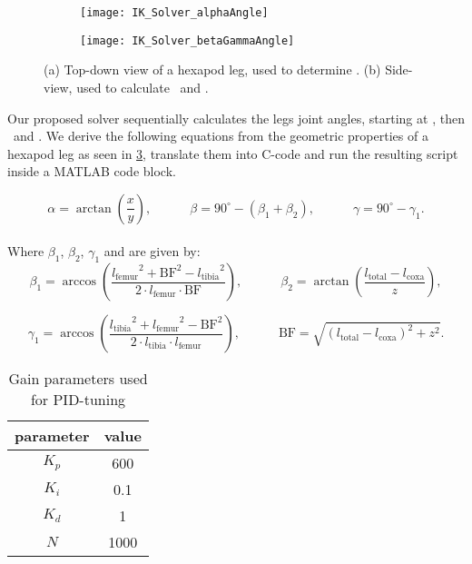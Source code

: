 \begin{figure}[!h]
	\begin{subfigure}{.5\textwidth} %
		\centering
		\texttt{[image: IK\_Solver\_alphaAngle]}  %
		\caption{}
		\label{figure: IK Solver Alpha Angle}
	\end{subfigure}
	\begin{subfigure}{.5\textwidth}
		\centering
		\texttt{[image: IK\_Solver\_betaGammaAngle]}  
		\caption{}
		\label{figure: IK Solver Beta/Gamma Angle}
	\end{subfigure}
	\caption[Angle derivation drawings]{(a) Top-down view of a hexapod leg, used to determine \textalpha. (b) Side-view, used to calculate \textbeta \ and \textgamma.}
	\label{figure: IK angle derivations}
\end{figure}

Our proposed solver sequentially calculates the legs joint angles, starting at \textalpha, then \textbeta \ and \textgamma.
We derive the following equations from the geometric properties of a hexapod leg as seen in \ref{figure: IK angle derivations}, translate them into C-code and run the resulting script inside a MATLAB code block.

\[
	\alpha = \arctan(\frac{x}{y}) ,\quad \quad \quad \beta = 90^{\circ} - (\beta_1 + \beta_2) ,\quad \quad \quad \gamma = 90^{\circ} - \gamma_1.
\]
\\
Where $\beta_1$, $\beta_2$, $\gamma_1$ and  are given by:
\[	
	\beta_1 = \arccos(\frac{{l_\text{femur}}^2 + \text{BF}^2 - {l_\text{tibia}}^2}  {2\cdot l_\text{femur} \cdot \text{BF}}) ,\quad \quad \quad \beta_2 = \arctan(\frac{ l_\text{total} - l_\text{coxa}} {z}),
\]

\[
	\gamma_1 = \arccos(\frac{{l_\text{tibia}}^2 + {l_\text{femur}}^2 - {\text{BF}}^2}  {2 \cdot {l_\text{tibia}} \cdot {l_\text{femur}}}) ,\quad \quad \quad \text{BF} = \sqrt{(l_\text{total} - l_\text{coxa})^2 + z^2}.
\]

\begin{table}[h!]
	\centering
	\begin{tabular}{| c | c |}
		\hline
		parameter & value\\
		\hline
		$K_p$ & 600 \\
		\hline
		$K_i$ & 0.1 \\
		\hline
		$K_d$ & 1 \\
		\hline
		$N$ & 1000 \\
		\hline
	\end{tabular}
	\caption{Gain parameters used for PID-tuning}
	\label{table: PID parameters}
\end{table}

